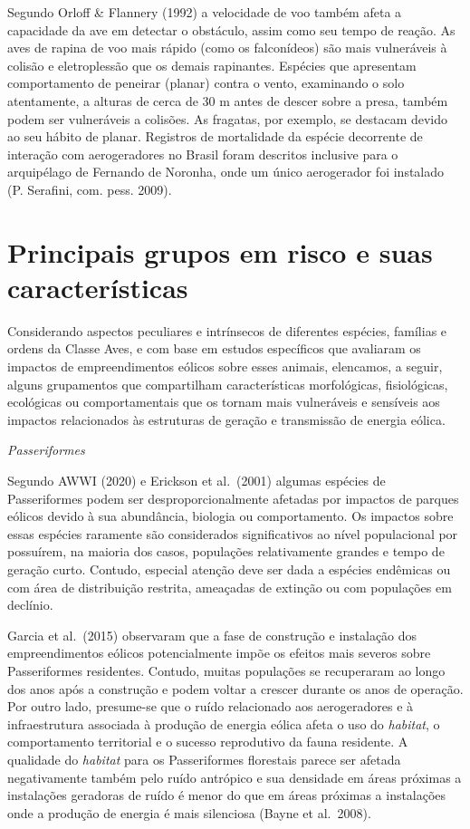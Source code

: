 \documentclass[
  oneside]{scrbook}
\begin{document}
Segundo Orloff \& Flannery (1992) a velocidade de voo também afeta a capacidade da ave em detectar o obstáculo, assim como seu tempo de reação. As aves de rapina de voo mais rápido (como os falconídeos) são mais vulneráveis à colisão e eletroplessão que os demais rapinantes. Espécies que apresentam comportamento de peneirar (planar) contra o vento, examinando o solo atentamente, a alturas de cerca de 30 m antes de descer sobre a presa, também podem ser vulneráveis a colisões. As fragatas, por exemplo, se destacam devido ao seu hábito de planar. Registros de mortalidade da espécie decorrente de interação com aerogeradores no Brasil foram descritos inclusive para o arquipélago de Fernando de Noronha, onde um único aerogerador foi instalado (P. Serafini, com. pess. 2009).

\hypertarget{principais-grupos-em-risco-e-suas-caracteruxedsticas}{%
\section{Principais grupos em risco e suas características}\label{principais-grupos-em-risco-e-suas-caracteruxedsticas}}

Considerando aspectos peculiares e intrínsecos de diferentes espécies, famílias e ordens da Classe Aves, e com base em estudos específicos que avaliaram os impactos de empreendimentos eólicos sobre esses animais, elencamos, a seguir, alguns grupamentos que compartilham características morfológicas, fisiológicas, ecológicas ou comportamentais que os tornam mais vulneráveis e sensíveis aos impactos relacionados às estruturas de geração e transmissão de energia eólica.

\emph{Passeriformes}

Segundo AWWI (2020) e Erickson et al.~(2001) algumas espécies de Passeriformes podem ser desproporcionalmente afetadas por impactos de parques eólicos devido à sua abundância, biologia ou comportamento. Os impactos sobre essas espécies raramente são considerados significativos ao nível populacional por possuírem, na maioria dos casos, populações relativamente grandes e tempo de geração curto. Contudo, especial atenção deve ser dada a espécies endêmicas ou com área de distribuição restrita, ameaçadas de extinção ou com populações em declínio.

Garcia et al.~(2015) observaram que a fase de construção e instalação dos empreendimentos eólicos potencialmente impõe os efeitos mais severos sobre Passeriformes residentes. Contudo, muitas populações se recuperaram ao longo dos anos após a construção e podem voltar a crescer durante os anos de operação. Por outro lado, presume-se que o ruído relacionado aos aerogeradores e à infraestrutura associada à produção de energia eólica afeta o uso do \emph{habitat}, o comportamento territorial e o sucesso reprodutivo da fauna residente. A qualidade do \emph{habitat} para os Passeriformes florestais parece ser afetada negativamente também pelo ruído antrópico e sua densidade em áreas próximas a instalações geradoras de ruído é menor do que em áreas próximas a instalações onde a produção de energia é mais silenciosa (Bayne et al.~2008).
\end{document}
